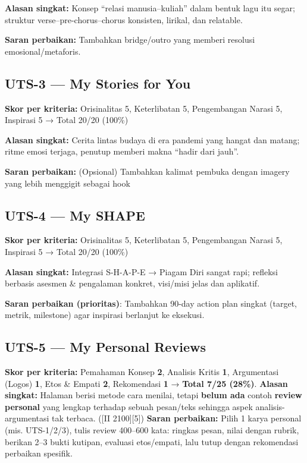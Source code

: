 \documentclass[
  letterpaper,
  DIV=11,
  numbers=noendperiod]{scrreprt}
\begin{document}
\textbf{Alasan singkat:} Konsep ``relasi manusia--kuliah'' dalam bentuk
lagu itu segar; struktur verse--pre-chorus--chorus konsisten, lirikal,
dan relatable.

\textbf{Saran perbaikan:} Tambahkan bridge/outro yang memberi resolusi
emosional/metaforis.

\subsection{UTS-3 --- My Stories for
You}\label{uts-3-my-stories-for-you-1}

\textbf{Skor per kriteria:} Orisinalitas 5, Keterlibatan 5, Pengembangan
Narasi 5, Inspirasi 5 → Total 20/20 (100\%)

\textbf{Alasan singkat:} Cerita lintas budaya di era pandemi yang hangat
dan matang; ritme emosi terjaga, penutup memberi makna ``hadir dari
jauh''.

\textbf{Saran perbaikan:} (Opsional) Tambahkan kalimat pembuka dengan
imagery yang lebih menggigit sebagai hook

\subsection{UTS-4 --- My SHAPE}\label{uts-4-my-shape}

\textbf{Skor per kriteria:} Orisinalitas 5, Keterlibatan 5, Pengembangan
Narasi 5, Inspirasi 5 → Total 20/20 (100\%)

\textbf{Alasan singkat:} Integrasi S-H-A-P-E → Piagam Diri sangat rapi;
refleksi berbasis asesmen \& pengalaman konkret, visi/misi jelas dan
aplikatif.

\textbf{Saran perbaikan (prioritas)}: Tambahkan 90-day action plan
singkat (target, metrik, milestone) agar inspirasi berlanjut ke
eksekusi.

\subsection{UTS-5 --- My Personal
Reviews}\label{uts-5-my-personal-reviews-1}

\textbf{Skor per kriteria:} Pemahaman Konsep \textbf{2}, Analisis Kritis
\textbf{1}, Argumentasi (Logos) \textbf{1}, Etos \& Empati \textbf{2},
Rekomendasi \textbf{1} → \textbf{Total 7/25 (28\%)}. \textbf{Alasan
singkat:} Halaman berisi metode cara menilai, tetapi \textbf{belum ada}
contoh \textbf{review personal} yang lengkap terhadap sebuah pesan/teks
sehingga aspek analisis-argumentasi tak terbaca. ({[}II 2100{]}{[}5{]})
\textbf{Saran perbaikan:} Pilih 1 karya personal (mis. UTS-1/2/3), tulis
review 400--600 kata: ringkas pesan, nilai dengan rubrik, berikan 2--3
bukti kutipan, evaluasi etos/empati, lalu tutup dengan rekomendasi
perbaikan spesifik.
\end{document}
